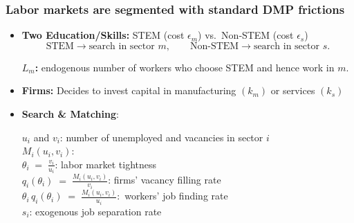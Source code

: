 \documentclass[9pt,xcolor={svgnames}]{beamer}
\begin{document}
\begin{frame}
\frametitle{Labor markets are segmented with standard DMP frictions}
\vspace{1em}
 \begin{itemize}
    \item \textbf{Two Education/Skills:} STEM (cost $\epsilon_m$) vs.\ Non‐STEM (cost $\epsilon_s$) 
      \[
        \text{STEM} \to \text{search in sector }m ,\quad \quad 
        \text{Non‐STEM} \to \text{search in sector }s.
      \]

  \textbf{$L_m$:} endogenous number of workers who choose STEM and hence work in $m$.

  \vspace{1em}
  
\item \textbf{Firms:} Decides to invest capital in manufacturing $(k_m)$ or services $(k_s)$

    \vspace{1em}
    
    \item \textbf{Search \& Matching}:    
      
  $ u_i$ and $v_i$:   \quad number of unemployed and vacancies in sector $i$\\
  \vspace{1mm}
    $ M_i(u_i,v_i)$: \quad {}  \\
\vspace{1mm}
       $ \theta_i \;=\; \frac{v_i}{u_i}$: \quad  labor market tightness \\
       \vspace{1mm}
       $ q_i(\theta_i) \;=\; \frac{M_i(u_i,v_i)}{v_i}$: \quad  firms' vacancy filling rate\\
       \vspace{1mm}
      $  \theta_i\,q_i(\theta_i) \;=\;\frac{M_i(u_i,v_i)}{u_i}:$ \quad 
      workers' job finding rate \\

\vspace{1mm}
    $s_i$: exogenous job separation rate
      \vspace{1mm}
      
  \end{itemize}
\end{frame}
\end{document}
